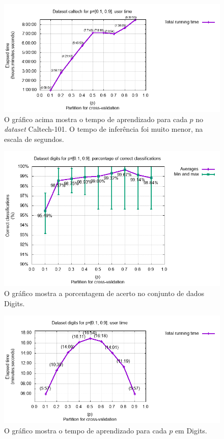 \documentclass[12pt]{article}
\theoremstyle{plain}
\numberwithin{equation}{section}
\begin{document}
\begin{figure}[H]
  \centering\includegraphics[scale=0.75]{imgs/caltech_time.png}
  \captionsetup{justification=raggedright}
  \caption{O gráfico acima mostra o tempo de aprendizado para cada $p$ no \textit{dataset}
  Caltech-101. O tempo de inferência foi muito menor, na escala de segundos.}
\end{figure}

\begin{figure}[h]
  \centering\includegraphics[scale=0.8]{imgs/digits_percs.png}
  \caption{O gráfico mostra a porcentagem de acerto no conjunto de dados Digits.}
\end{figure}

\begin{figure}[H]
  \centering\includegraphics[scale=0.9]{imgs/digits_time.png}
  \caption{O gráfico mostra o tempo de aprendizado para cada $p$ em Digits.}
\end{figure}
\end{document}
